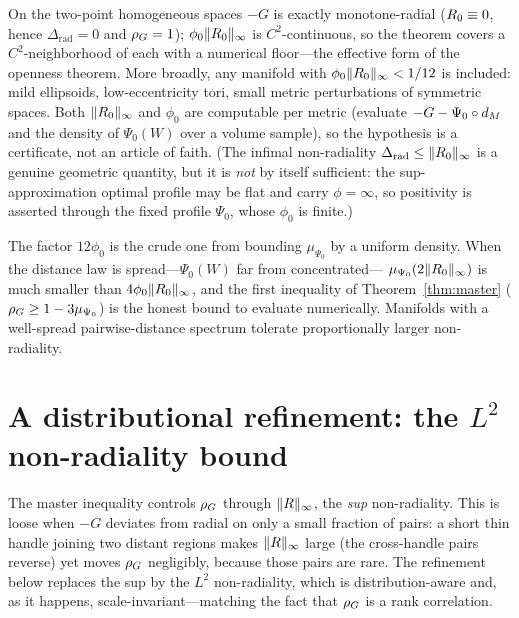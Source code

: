 \begin{remark}
On the two-point homogeneous spaces $-G$ is exactly monotone-radial ($R_0\equiv0$,
hence $\Delta_{\mathrm{rad}}=0$ and $\rho_G=1$); $\phi_0\lVert R_0\rVert_\infty$ is
$C^2$-continuous, so the theorem covers a $C^2$-neighborhood of each with a numerical
floor---the effective form of the openness theorem. More broadly, any manifold with
$\phi_0\lVert R_0\rVert_\infty<1/12$ is included: mild ellipsoids, low-eccentricity
tori, small metric perturbations of symmetric spaces. Both $\lVert R_0\rVert_\infty$ and
$\phi_0$ are computable per metric (evaluate $-G-\Psi_0\circ d_M$ and the density of
$\Psi_0(W)$ over a volume sample), so the hypothesis is a certificate, not an article of
faith. (The infimal non-radiality $\Delta_{\mathrm{rad}}\le\lVert R_0\rVert_\infty$ is a
genuine geometric quantity, but it is \emph{not} by itself sufficient: the sup-approximation
optimal profile may be flat and carry $\phi=\infty$, so positivity is asserted through the
fixed profile $\Psi_0$, whose $\phi_0$ is finite.)
\end{remark}

\begin{remark}
The factor $12\phi_0$ is the crude one from bounding $\mu_{\Psi_0}$ by a uniform density.
When the distance law is spread---$\Psi_0(W)$ far from concentrated---%
$\mu_{\Psi_0}(2\lVert R_0\rVert_\infty)$ is much smaller than
$4\phi_0\lVert R_0\rVert_\infty$, and the first inequality of Theorem~\ref{thm:master}
($\rho_G\ge1-3\mu_{\Psi_0}$) is the honest bound to evaluate numerically. Manifolds with a
well-spread pairwise-distance spectrum tolerate proportionally larger non-radiality.
\end{remark}

\section{A distributional refinement: the $L^2$ non-radiality bound}

The master inequality controls $\rho_G$ through $\lVert R\rVert_\infty$, the \emph{sup}
non-radiality. This is loose when $-G$ deviates from radial on only a small fraction of
pairs: a short thin handle joining two distant regions makes $\lVert R\rVert_\infty$ large
(the cross-handle pairs reverse) yet moves $\rho_G$ negligibly, because those pairs are rare.
The refinement below replaces the sup by the \emph{$L^2$} non-radiality, which is
distribution-aware and, as it happens, scale-invariant---matching the fact that $\rho_G$ is a
rank correlation.

